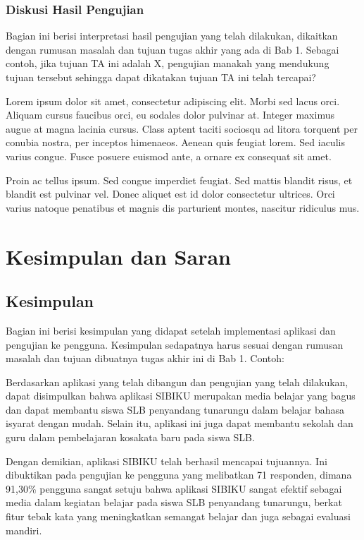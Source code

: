\documentclass[a4paper,11pt,oneside]{report}
\begin{document}
\subsection{Diskusi Hasil Pengujian}
Bagian ini berisi interpretasi hasil pengujian yang telah dilakukan, dikaitkan
dengan rumusan masalah dan tujuan tugas akhir yang ada di Bab 1. Sebagai contoh,
jika tujuan TA ini adalah X, pengujian manakah yang mendukung tujuan tersebut
sehingga dapat dikatakan tujuan TA ini telah tercapai?

Lorem ipsum dolor sit amet, consectetur adipiscing elit. Morbi sed lacus orci.
Aliquam cursus faucibus orci, eu sodales dolor pulvinar at. Integer maximus augue
at magna lacinia cursus. Class aptent taciti sociosqu ad litora torquent per
conubia nostra, per inceptos himenaeos. Aenean quis feugiat lorem. Sed iaculis
varius congue. Fusce posuere euismod ante, a ornare ex consequat sit amet.

Proin ac tellus ipsum. Sed congue imperdiet feugiat. Sed mattis blandit risus,
et blandit est pulvinar vel. Donec aliquet est id dolor consectetur ultrices.
Orci varius natoque penatibus et magnis dis parturient montes, nascitur
ridiculus mus.

\chapter{Kesimpulan dan Saran}

\section{Kesimpulan}
Bagian ini berisi kesimpulan yang didapat setelah implementasi aplikasi dan
pengujian ke pengguna. Kesimpulan sedapatnya harus sesuai dengan rumusan masalah
dan tujuan dibuatnya tugas akhir ini di Bab 1. Contoh:

Berdasarkan aplikasi yang telah dibangun dan pengujian yang telah dilakukan,
dapat disimpulkan bahwa aplikasi SIBIKU merupakan media belajar yang bagus dan
dapat membantu siswa SLB penyandang tunarungu dalam belajar bahasa isyarat
dengan mudah. Selain itu, aplikasi ini juga dapat membantu sekolah dan guru
dalam pembelajaran kosakata baru pada siswa SLB.

Dengan demikian, aplikasi SIBIKU telah berhasil mencapai tujuannya. Ini
dibuktikan pada pengujian ke pengguna yang melibatkan 71 responden, dimana
91,30\% pengguna sangat setuju bahwa aplikasi SIBIKU sangat efektif sebagai media
dalam kegiatan belajar pada siswa SLB penyandang tunarungu, berkat fitur tebak
kata yang meningkatkan semangat belajar dan juga sebagai evaluasi mandiri.
\end{document}
